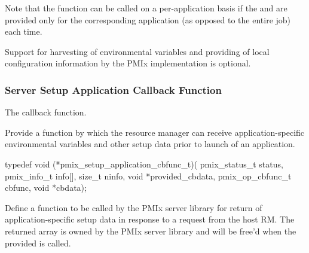 Note that the function can be called on a per-application basis if the  and  are provided only for the corresponding application (as opposed to the entire job) each time.
\advicermend

\adviceimplstart
Support for harvesting of environmental variables and providing of local configuration information by the \ac{PMIx} implementation is optional.
\adviceimplend

\subsubsection{Server Setup Application Callback Function}

The  callback function.

\summary

Provide a function by which the resource manager can receive application-specific environmental variables and other setup data prior to launch of an application.

\format

\cspecificstart
\begin{codepar}
typedef void (*pmix_setup_application_cbfunc_t)(
                        pmix_status_t status,
                        pmix_info_t info[], size_t ninfo,
                        void *provided_cbdata,
                        pmix_op_cbfunc_t cbfunc, void *cbdata);
\end{codepar}
\cspecificend

\begin{arglist}
\end{arglist}

\descr

Define a function to be called by the \ac{PMIx} server library for return of application-specific setup data in response to a request from the host \ac{RM}. The returned  array is owned by the \ac{PMIx} server library and will be free'd when the provided  is called.


